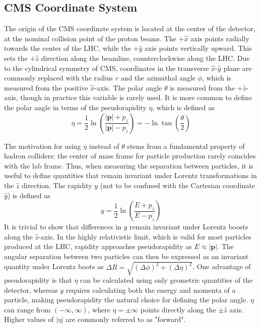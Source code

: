 \subsection{CMS Coordinate System} \label{sec:CMS_coord}
The origin of the CMS coordinate system is located at the center of the detector, at the nominal collision point of the proton beams. The $+\hat{x}$ axis points radially towards the center of the LHC, while the $+\hat{y}$ axis points vertically upward. This sets the $+\hat{z}$ direction along the beamline, counterclockwise along the LHC. Due to the cylindrical symmetry of CMS, coordinates in the transverse $\hat{x}$-$\hat{y}$ plane are commonly replaced with the radius $r$ and the azimuthal angle $\phi$, which is measured from the positive $\hat{x}$-axis. The polar angle $\theta$ is measured from the $+\hat{z}$-axis, though in practice this variable is rarely used. It is more common to define the polar angle in terms of the pseudorapidity $\eta$, which is defined as
\begin{equation}
	\eta=\frac{1}{2}\ln\left(\frac{|\mathbf{p}|+p_{z}}{|\mathbf{p}|-p_{z}}\right)=-\ln{\tan\left(\frac{\theta}{2}\right)}
\end{equation}
 
The motivation for using $\eta$ instead of $\theta$ stems from a fundamental property of hadron colliders: the center of mass frame for particle production rarely coincides with the lab frame. Thus, when measuring the separation between particles, it is useful to define quantities that remain invariant under Lorentz transformations in the $\hat{z}$ direction. The rapidity $y$ (not to be confused with the Cartesian coordinate $\hat{y}$) is defined as
\begin{equation}
	y=\frac{1}{2}\ln\left(\frac{E+p_{z}}{E-p_{z}}\right)
\end{equation}
It is trivial to show that differences in $y$ remain invariant under Lorentz boosts along the $\hat{z}$-axis. In the highly relativistic limit, which is valid for most particles produced at the LHC, rapidity approaches pseudorapidity as $E\approx|\mathbf{p}|$. The angular separation between two particles can then be expressed as an invariant quantity under Lorentz boots as $\Delta R=\sqrt{\left(\Delta\phi\right)^2+\left(\Delta\eta\right)^2}$. One advantage of pseudorapidity is that $\eta$ can be calculated using only geometric quantities of the detector, whereas $y$ requires calculating both the energy and momenta of a particle, making pseudorapidity the natural choice for defining the polar angle. $\eta$ can range from $\left(-\infty, \infty\right)$, where $\eta=\pm\infty$ points directly along the $\pm\hat{z}$ axis. Higher values of $\left|\eta\right|$ are commonly referred to as "forward".

